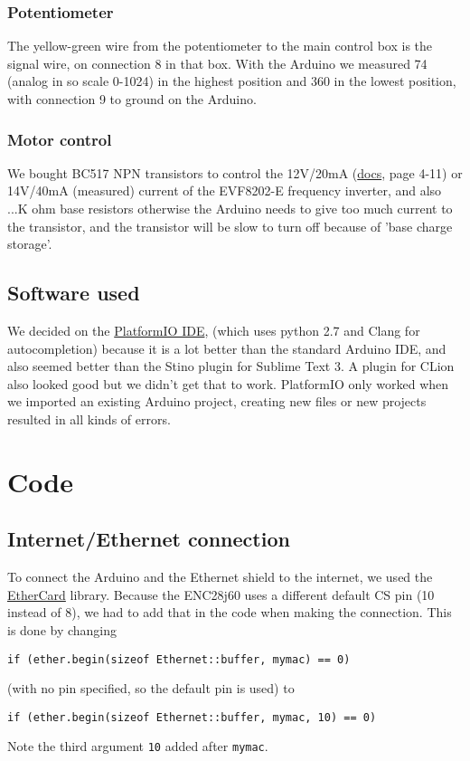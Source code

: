 \documentclass{article}
\begin{document}
	\subsubsection{Potentiometer}
	The yellow-green wire from the potentiometer to the main control box is the signal wire, on connection 8 in that box. With the Arduino we measured 74 (analog in so scale 0-1024) in the highest position and 360 in the lowest position, with connection 9 to ground on the Arduino.
	\subsubsection{Motor control}
	We bought BC517 NPN transistors to control the 12V/20mA (\href{http://download.lenze.com/TD/8201-8204__Inverter__v02-08__EN.pdf }{docs}, page 4-11) or 14V/40mA (measured) current of the EVF8202-E frequency inverter, and also ...K ohm base resistors otherwise the Arduino needs to give too much current to the transistor, and the transistor will be slow to turn off because of 'base charge storage'.

	\subsection{Software used}
	We decided on the \href{http://platformio.org/platformio-ide}{PlatformIO IDE}, (which uses python 2.7 and Clang for autocompletion) because it is a lot better than the standard Arduino IDE, and also seemed better than the Stino plugin for Sublime Text 3. A plugin for CLion also looked good but we didn't get that to work. PlatformIO only worked when we imported an existing Arduino project, creating new files or new projects resulted in all kinds of errors.
	
	\section{Code}
		\subsection{Internet/Ethernet connection}
			To connect the Arduino and the Ethernet shield to the internet, we used the \href{https://github.com/jcw/ethercard}{EtherCard} library. Because the ENC28j60 uses a different default CS pin (10 instead of 8), we had to add that in the code when making the connection. This is done by changing
			\begin{lstlisting}
if (ether.begin(sizeof Ethernet::buffer, mymac) == 0)
			\end{lstlisting}
			(with no pin specified, so the default pin is used) to
			\begin{lstlisting}
if (ether.begin(sizeof Ethernet::buffer, mymac, 10) == 0)
			\end{lstlisting}
			Note the third argument \lstinline|10| added after \lstinline|mymac|.
\end{document}

